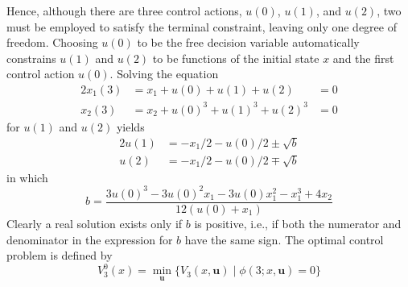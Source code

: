\documentclass{article}
\newcommand{\useq}{\mathbf{u}}
\begin{document}
Hence, although there are three control actions, $u(0)$, $u(1)$, and
$u(2)$, 
two must be employed to satisfy the terminal constraint, leaving only
one degree of freedom. Choosing $u(0)$ to be the free decision
variable automatically constrains $u(1)$ and $u(2)$ to be functions
of the initial state $x$ and the first control action $u(0)$. Solving
the equation
\begin{alignat*}{2}
  x_1(3) &=  x_1+u(0)+u(1)+u(2) &= 0\\
  x_2(3) &=  x_2+u(0)^3+u(1)^3+u(2)^3 &=0 
\end{alignat*}
for $u(1)$ and $u(2)$ yields
\begin{alignat*}{2}
  u(1) &= -x_1/2-u(0)/2 \pm \sqrt{b}\\
  u(2) &= -x_1/2-u(0)/2 \mp \sqrt{b}
\end{alignat*}
in which
\begin{equation*}
  b =\frac
  {3u(0)^3 - 3u(0)^2x_1 - 3u(0)x_1^2 -x_1^3 + 4x_2}{12(u(0)+x_1)}
\end{equation*}
Clearly a real solution exists only if $b$ is positive, i.e., if both
the numerator and denominator in the expression for $b$ have the same
sign.  The optimal control problem is defined by
\begin{equation*}
  V_3^0(x) = \min_{\useq} \{V_3(x,\useq) \mid \phi(3;x,\useq)=0\}
\end{equation*}
\end{document}
